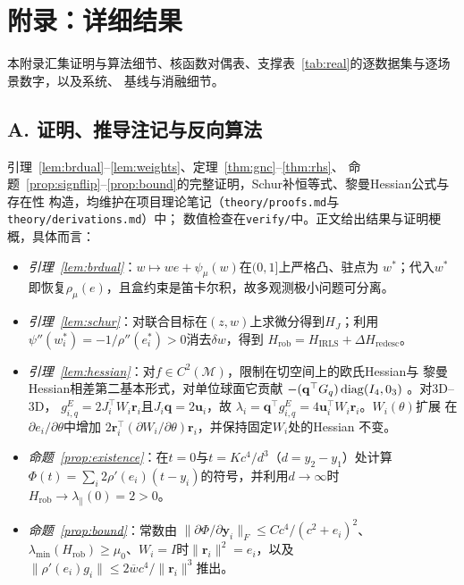 \section*{附录：详细结果}
\label{app:start}

本附录汇集证明与算法细节、核函数对偶表、支撑表~\ref{tab:real}的逐数据集与逐场景数字，以及系统、
基线与消融细节。

\subsection*{A. 证明、推导注记与反向算法}
\label{app:proofs}
\label{app:backward}

引理~\ref{lem:brdual}--\ref{lem:weights}、定理~\ref{thm:gnc}--\ref{thm:rhs}、
命题~\ref{prop:signflip}--\ref{prop:bound}的完整证明，Schur补恒等式、黎曼Hessian公式与存在性
构造，均维护在项目理论笔记（\texttt{theory/proofs.md}与\texttt{theory/derivations.md}）中；
数值检查在\texttt{verify/}中。正文给出结果与证明梗概，具体而言：

\begin{itemize}
\item \emph{引理~\ref{lem:brdual}}：$w\mapsto we+\psi_\mu(w)$在$(0,1]$上严格凸、驻点为
  $w^*$；代入$w^*$即恢复$\rho_\mu(e)$，且盒约束是笛卡尔积，故多观测极小问题可分离。
\item \emph{引理~\ref{lem:schur}}：对联合目标在$(z,w)$上求微分得到$H_J$；利用
  $\psi''(w_i^*)=-1/\rho''(e_i^*)>0$消去$\delta w$，得到
  $H_{\mathrm{rob}}=H_{\mathrm{IRLS}}+\Delta H_{\mathrm{redesc}}$。
\item \emph{引理~\ref{lem:hessian}}：对$f\in C^2(\mathcal{M})$，限制在切空间上的欧氏Hessian与
  黎曼Hessian相差第二基本形式，对单位球面它贡献
  $-(\mathbf{q}^\top G_q)\operatorname{diag}(I_4,0_3)$ \cite{absil2008}。对3D--3D，
  $g_{i,q}^E=2J_i^\top W_i\mathbf{r}_i$且$J_i\mathbf{q}=2\mathbf{u}_i$，故
  $\lambda_i=\mathbf{q}^\top g_{i,q}^E=4\mathbf{u}_i^\top W_i\mathbf{r}_i$。$W_i(\theta)$扩展
  在$\partial e_i/\partial\theta$中增加
  $2\mathbf{r}_i^\top(\partial W_i/\partial\theta)\mathbf{r}_i$，并保持固定$W_i$处的Hessian
  不变。
\item \emph{命题~\ref{prop:existence}}：在$t=0$与$t=Kc^4/d^3$（$d=y_2-y_1$）处计算
  $\Phi(t)=\sum_i2\rho'(e_i)(t-y_i)$的符号，并利用$d\to\infty$时
  $H_{\mathrm{rob}}\to\lambda_\parallel(0)=2>0$。
\item \emph{命题~\ref{prop:bound}}：常数由
  $\|\partial\Phi/\partial\mathbf{y}_i\|_F\le Cc^4/(c^2+e_i)^2$、
  $\lambda_{\min}(H_{\mathrm{rob}})\ge\mu_0$、$W_i=I$时$\|\mathbf{r}_i\|^2=e_i$，以及
  $\|\rho'(e_i)g_i\|\le2\overline wc^4/\|\mathbf{r}_i\|^3$推出。
\end{itemize}


